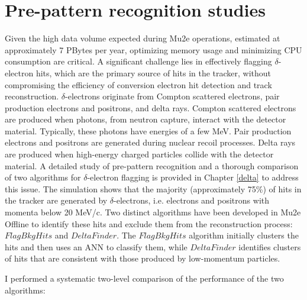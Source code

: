 \section{Pre-pattern recognition studies}
Given the high data volume expected during Mu2e operations, estimated 
at approximately 7 PBytes per year, optimizing memory usage and minimizing 
CPU consumption are critical. A significant challenge lies in effectively 
flagging $\delta$-electron hits, which are the primary source of hits in 
the tracker, without compromising the efficiency of conversion electron 
hit detection and track reconstruction. $\delta$-electrons originate from 
Compton scattered electrons, pair production electrons and positrons, and 
delta rays. Compton scattered electrons are produced when photons, from 
neutron capture, interact with the detector material. Typically, these 
photons have energies of a few MeV. Pair production electrons and positrons 
are generated during nuclear recoil processes. Delta rays 
are produced when high-energy charged particles collide 
with the detector material. A detailed study of pre-pattern recognition 
and a thorough comparison of two algorithms for $\delta$-electron flagging is 
provided in Chapter \ref{delta} to address this issue.
The simulation shows that the majority 
(approximately 75\%) 
of hits in the tracker are generated by 
$\delta$-electrons, i.e. electrons 
and positrons with momenta below 20 MeV/c. 
Two distinct algorithms 
have been developed in Mu2e Offline to 
identify these hits and exclude 
them from the reconstruction process: 
$FlagBkgHits$ and $DeltaFinder$. 
The $FlagBkgHits$ algorithm initially 
clusters the hits and then uses an ANN 
to classify them, while $DeltaFinder$ 
identifies clusters of hits that are 
consistent with those produced by 
low-momentum particles.

I performed a systematic two-level comparison of the performance of the two algorithms:


